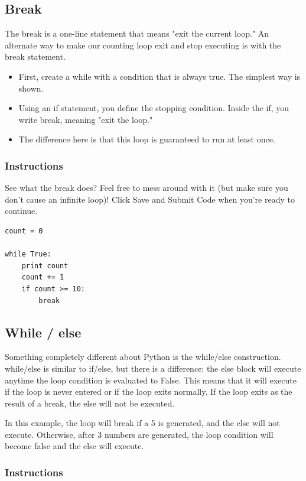 \documentclass[12pt,a4paper,final,twoside,onecolumn,titlepage]{book}
\begin{document}
\subsection{Break}

The break is a one-line statement that means "exit the current loop." An alternate way to make our counting loop exit and stop executing is with the break statement.
\begin{itemize}
\item    First, create a while with a condition that is always true. The simplest way is shown.

\item    Using an if statement, you define the stopping condition. Inside the if, you write break, meaning "exit the loop."

\item The difference here is that this loop is guaranteed to run at least once.
\end{itemize}

\subsubsection{Instructions}
See what the break does? Feel free to mess around with it (but make sure you don't cause an infinite loop)! Click Save and Submit Code when you're ready to continue.

\begin{lstlisting}
count = 0

while True:
    print count
    count += 1
    if count >= 10:
        break
\end{lstlisting}

\subsection{While / else}

Something completely different about Python is the while/else construction. while/else is similar to if/else, but there is a difference: the else block will execute anytime the loop condition is evaluated to False. This means that it will execute if the loop is never entered or if the loop exits normally. If the loop exits as the result of a break, the else will not be executed.

In this example, the loop will break if a 5 is generated, and the else will not execute. Otherwise, after 3 numbers are generated, the loop condition will become false and the else will execute.
\subsubsection{Instructions}
\end{document}
